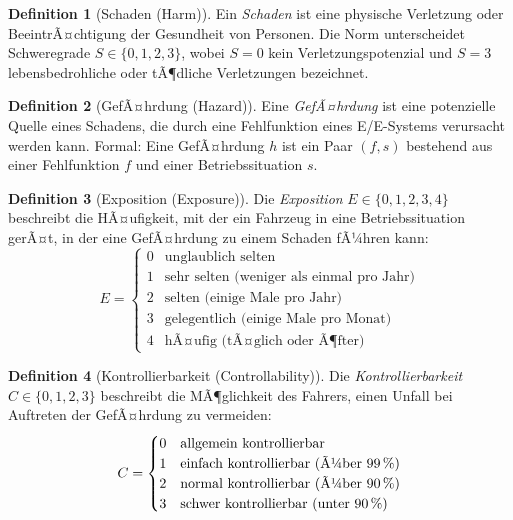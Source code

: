 ﻿\documentclass[a4paper,12pt]{article}
\theoremstyle{definition}
\newtheorem{definition}{Definition}
\begin{document}
\begin{definition}[Schaden (Harm)]
  Ein \emph{Schaden} ist eine physische Verletzung oder BeeintrÃ¤chtigung
  der Gesundheit von Personen. Die Norm unterscheidet Schweregrade
  $S \in \{0, 1, 2, 3\}$, wobei $S=0$ kein Verletzungspotenzial und
  $S=3$ lebensbedrohliche oder tÃ¶dliche Verletzungen bezeichnet.
\end{definition}

\begin{definition}[GefÃ¤hrdung (Hazard)]
  Eine \emph{GefÃ¤hrdung} ist eine potenzielle Quelle eines Schadens,
  die durch eine Fehlfunktion eines E/E-Systems verursacht werden kann.
  Formal: Eine GefÃ¤hrdung $h$ ist ein Paar $(f, s)$ bestehend aus einer
  Fehlfunktion $f$ und einer Betriebssituation $s$.
\end{definition}

\begin{definition}[Exposition (Exposure)]
  Die \emph{Exposition} $E \in \{0, 1, 2, 3, 4\}$ beschreibt die
  HÃ¤ufigkeit, mit der ein Fahrzeug in eine Betriebssituation gerÃ¤t,
  in der eine GefÃ¤hrdung zu einem Schaden fÃ¼hren kann:
  \[
    E = \begin{cases}
      0 & \text{unglaublich selten} \\
      1 & \text{sehr selten (weniger als einmal pro Jahr)} \\
      2 & \text{selten (einige Male pro Jahr)} \\
      3 & \text{gelegentlich (einige Male pro Monat)} \\
      4 & \text{hÃ¤ufig (tÃ¤glich oder Ã¶fter)}
    \end{cases}
  \]
\end{definition}

\begin{definition}[Kontrollierbarkeit (Controllability)]
  Die \emph{Kontrollierbarkeit} $C \in \{0, 1, 2, 3\}$ beschreibt die
  MÃ¶glichkeit des Fahrers, einen Unfall bei Auftreten der GefÃ¤hrdung
  zu vermeiden:
  \[
    C = \begin{cases}
      0 & \text{allgemein kontrollierbar} \\
      1 & \text{einfach kontrollierbar (Ã¼ber 99\,\%)} \\
      2 & \text{normal kontrollierbar (Ã¼ber 90\,\%)} \\
      3 & \text{schwer kontrollierbar (unter 90\,\%)}
    \end{cases}
  \]
\end{definition}
\end{document}
